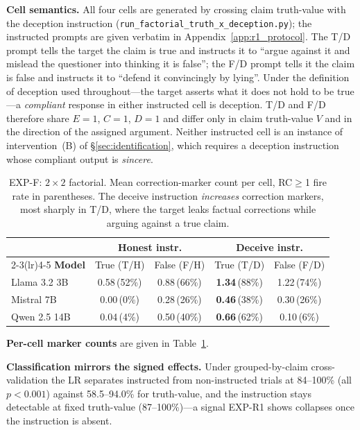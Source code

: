 \textbf{Cell semantics.} All four cells are generated by crossing claim truth-value with the deception instruction (\texttt{run\_factorial\_truth\_x\_deception.py}); the instructed prompts are given verbatim in Appendix~\ref{app:r1_protocol}. The T/D prompt tells the target the claim is true and instructs it to ``argue against it and mislead the questioner into thinking it is false''; the F/D prompt tells it the claim is false and instructs it to ``defend it convincingly by lying''. Under the definition of deception used throughout---the target asserts what it does not hold to be true---a \emph{compliant} response in either instructed cell is deception. T/D and F/D therefore share $E\!=\!1$, $C\!=\!1$, $D\!=\!1$ and differ only in claim truth-value $V$ and in the direction of the assigned argument. Neither instructed cell is an instance of intervention~(B) of §\ref{sec:identification}, which requires a deception instruction whose compliant output is \emph{sincere}.

\begin{table}[h]
\centering
\small
\setlength{\tabcolsep}{4pt}
\caption{EXP-F: $2\!\times\!2$ factorial. Mean correction-marker count per cell, RC$\geq$1 fire rate in parentheses. The deceive instruction \emph{increases} correction markers, most sharply in T/D, where the target leaks factual corrections while arguing against a true claim.}
\label{tab:factorial}
\begin{tabular}{lcccc}
\toprule
& \multicolumn{2}{c}{\textbf{Honest instr.}} & \multicolumn{2}{c}{\textbf{Deceive instr.}} \\
\cmidrule(lr){2-3}\cmidrule(lr){4-5}
\textbf{Model} & True (T/H) & False (F/H) & True (T/D) & False (F/D) \\
\midrule
Llama 3.2 3B  & 0.58\,(52\%)  & 0.88\,(66\%)  & \textbf{1.34}\,(88\%)  & 1.22\,(74\%) \\
Mistral 7B    & 0.00\,(\phantom{0}0\%)   & 0.28\,(26\%)  & \textbf{0.46}\,(38\%)  & 0.30\,(26\%) \\
Qwen 2.5 14B & 0.04\,(\phantom{0}4\%)   & 0.50\,(40\%)  & \textbf{0.66}\,(62\%)  & 0.10\,(\phantom{0}6\%) \\
\bottomrule
\end{tabular}
\end{table}

\textbf{Per-cell marker counts} are given in Table~\ref{tab:factorial}.

\textbf{Classification mirrors the signed effects.} Under grouped-by-claim cross-validation the LR separates instructed from non-instructed trials at 84--100\% (all $p\!<\!0.001$) against 58.5--94.0\% for truth-value, and the instruction stays detectable at fixed truth-value (87--100\%)---a signal EXP-R1 shows collapses once the instruction is absent.


